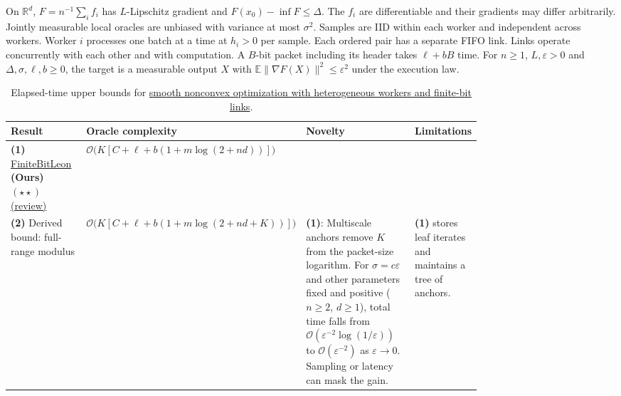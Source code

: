 \begin{table}[tp]
\centering
\caption{Elapsed-time upper bounds for \href{https://github.com/k3nfalt/longtails/blob/main/LongTails/Setups/BandwidthHeterogeneousSmoothNonconvex.lean}{smooth nonconvex optimization with heterogeneous workers and finite-bit links}.}\label{tab:BandwidthHeterogeneousSmoothNonconvex}
\parbox{\linewidth}{\footnotesize On $\mathbb R^d$, $F=n^{-1}\sum_i f_i$ has $L$-Lipschitz gradient and $F(x_0)-\inf F\le\Delta$. The $f_i$ are differentiable and their gradients may differ arbitrarily. Jointly measurable local oracles are unbiased with variance at most $\sigma^2$. Samples are IID within each worker and independent across workers. Worker $i$ processes one batch at a time at $h_i>0$ per sample. Each ordered pair has a separate FIFO link. Links operate concurrently with each other and with computation. A $B$-bit packet including its header takes $\ell+bB$ time. For $n\ge1$, $L,\varepsilon>0$ and $\Delta,\sigma,\ell,b\ge0$, the target is a measurable output $X$ with $\mathbb E\|\nabla F(X)\|^2\le\varepsilon^2$ under the execution law.}\par\smallskip
\begin{threeparttable}
\footnotesize
\setlength{\tabcolsep}{4pt}\renewcommand{\arraystretch}{1.25}
\begin{tabularx}{\linewidth}{@{}>{\raggedright\arraybackslash}p{0.18\linewidth}>{\raggedright\arraybackslash}p{0.32\linewidth}>{\raggedright\arraybackslash}p{0.27\linewidth}>{\raggedright\arraybackslash}X@{}}
\toprule
\textbf{Result} & \textbf{Oracle complexity} & \textbf{Novelty} & \textbf{Limitations} \\
\midrule
\textbf{(1)} \href{https://github.com/k3nfalt/longtails/blob/main/LongTails/Theorems/FiniteBitLeon.lean}{Finite\allowbreak Bit\allowbreak Leon} \textbf{(Ours)} $(\star\star)$ \href{https://github.com/k3nfalt/longtails/blob/main/scripts/reviews/FiniteBitLeon.md}{(review)}
& $\mathcal{O}\bigl(K[C+\ell+b(1+m\log(2+nd))]\bigr)$ & & \\
\midrule[1.2pt]
\textbf{(2)} Derived bound: full-range modulus \citep{bhFiniteBitNote}
& $\mathcal{O}\bigl(K[C+\ell+b(1+m\log(2+nd+K))]\bigr)$
& \textbf{(1)}: Multiscale anchors remove $K$ from the packet-size logarithm. For $\sigma=c\varepsilon$ and other parameters fixed and positive ($n\ge2$, $d\ge1$), total time falls from $\mathcal{O}(\varepsilon^{-2}\log(1/\varepsilon))$ to $\mathcal{O}(\varepsilon^{-2})$ as $\varepsilon\to0$. Sampling or latency can mask the gain.
& \textbf{(1)} stores leaf iterates and maintains a tree of anchors. \\

\end{tabularx}
\end{threeparttable}
\end{table}

